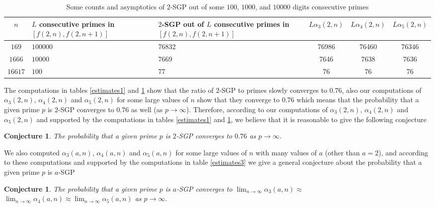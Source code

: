 \documentclass{amsart}
\newtheorem{conjecture}[theorem]{Conjecture}
\numberwithin{equation}{section}
\begin{document}
\begin{table}[!h]
	
	\begin{tabularx}{\textwidth}{|c|X|X|c|c|c|}
		\hline
		$n$ & $L$ consecutive primes in $[f(2,n),f(2,n+1)]$ & $2$-SGP out of $L$ consecutive primes in $[f(2,n),f(2,n+1)]$ & $L \alpha_3(2,n)$ & $L \alpha_4(2,n)$ & $L \alpha_5(2,n)$ \\
		\hline
		$169$ & $100000$ & 76832 & 76986 & 76460 & 76346 \\
		\hline
		$1666$ & $10000$ & 7669 & 7646 & 7638 & 7636 \\
		\hline
		$16617$ & $100$ & 77 & 76 & 76 & 76 \\
		\hline    
	\end{tabularx}
	\caption{Some counts and asymptotics of $2$-SGP out of some $100$, $1000$, and $10000$ digits consecutive primes}
	\label{estimates2}
\end{table}

The computations in tables \ref{estimates1} and \ref{estimates2} show that the ratio of $2$-SGP to primes slowly converges to $0.76$, also our computations of $\alpha_3(2,n)$, $\alpha_4(2,n)$ and $\alpha_5(2,n)$ for some large values of $n$ show that they converge to $0.76$ which means that the probability that a given prime $p$ is $2$-SGP converges to $0.76$ as well (as $p \to \infty$). Therefore, according to our computations of $\alpha_3(2,n)$, $\alpha_4(2,n)$  and $\alpha_5(2,n)$ and supported by the computations in tables \ref{estimates1} and \ref{estimates2}, we believe that it is reasonable to give the following conjecture 

\begin{conjecture}\label{con51}
	The probability that a given prime $p$ is $2$-SGP converges to $0.76$ as $p \to \infty$.
\end{conjecture}

We also computed $\alpha_3(a,n)$, $\alpha_4(a,n)$ and $\alpha_5(a,n)$ for some large values of $n$ with many values of $a$ (other than $a=2$), and according to these computations and supported by the computations in table \ref{estimates3} we give a general conjecture about the probability that a given prime $p$ is $a$-SGP

\begin{conjecture}\label{con52}
	The probability that a given prime $p$ is $a$-SGP converges to $\displaystyle{\lim_{n \to \infty} \alpha_3(a,n) \approx }$ $ \displaystyle{\lim_{n \to \infty} \alpha_4(a,n) } \approx \lim_{n \to \infty} \alpha_5(a,n) $ as $p \to \infty$.
\end{conjecture}
\end{document}
